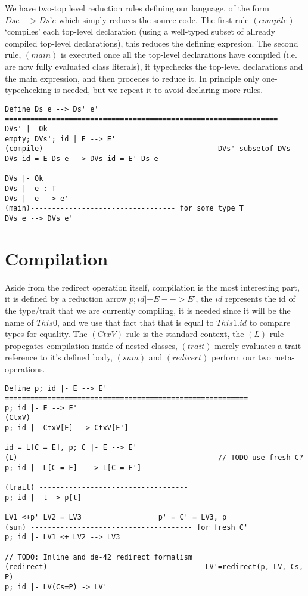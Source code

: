 We have two-top level reduction rules defining our language, of the form $Ds e ––> Ds’ e$ which simply reduces the source-code.
The first rule $(compile)$ ‘compiles’ each top-level declaration (using a well-typed subset of allready compiled top-level declarations), this reduces the defining expresion.
The second rule, $(main)$ is executed once all the top-level declarations have compiled (i.e. are now fully evaluated class literals), it typechecks the top-level declarations and the main expression, and then procedes to reduce it.
In principle only one-typechecking is needed, but we repeat it to avoid declaring more rules.
\begin{verbatim}
Define Ds e --> Ds' e'
================================================================
DVs' |- Ok
empty; DVs'; id | E --> E'
(compile)---------------------------------------- DVs' subsetof DVs
DVs id = E Ds e --> DVs id = E' Ds e

DVs |- Ok
DVs |- e : T
DVs |- e --> e'
(main)---------------------------------- for some type T
DVs e --> DVs e'
\end{verbatim}



\section{Compilation}

Aside from the redirect operation itself, compilation is the most interesting part, it is defined by a reduction arrow $p; id |- E --> E’$, the $id$ represents the id of the type/trait that we are currently compiling, it is needed since it will be the name of $This0$, and we use that fact that that is equal to $This1.id$ to compare types for equality.
The $(CtxV)$ rule is the standard context, the $(L)$ rule propegates compilation inside of nested-classes, $(trait)$ merely evaluates a trait reference to it’s defined body, $(sum)$ and $(redirect)$ perform our two meta-operations.

\begin{verbatim}
Define p; id |- E --> E'
=========================================================
p; id |- E --> E'
(CtxV) ----------------------------------------------
p; id |- CtxV[E] --> CtxV[E']

id = L[C = E], p; C |- E --> E'
(L) --------------------------------------------- // TODO use fresh C?
p; id |- L[C = E] ---> L[C = E']

(trait) -----------------------------------
p; id |- t -> p[t]

LV1 <+p' LV2 = LV3                  p' = C' = LV3, p
(sum) -------------------------------------- for fresh C'
p; id |- LV1 <+ LV2 --> LV3

// TODO: Inline and de-42 redirect formalism
(redirect) ------------------------------------LV'=redirect(p, LV, Cs, P)
p; id |- LV(Cs=P) -> LV'
\end{verbatim}

